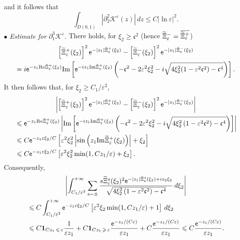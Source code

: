 \documentclass[10pt]{amsart}
\theoremstyle{definition}\newtheorem{defi}[theo]{Definition}\newtheorem{rema}[theo]{Remark}\newtheorem{exam}[theo]{Example}\newtheorem{exem}[theo]{Example}\newtheorem{nota}[theo]{Notation}
\newcommand*\p{\partial}
\newcommand{\Imm}{\mathrm{Im}}
\newcommand{\Rel}{\mathrm{Re}}
\newcommand*\BK{\mathcal{K}}
\newcommand{\bfun}{\mathbf{1}}
\newcommand*\ex{{\sf e}}
\newcommand*\cs{{\mathfrak c}}
\newcommand*\ii{\infty}
\newcommand*\gs{\geqslant }
\newcommand*\ls{\leqslant }
\newcommand*\e{\varepsilon}
\newcommand*\lne{\lvert \ln \varepsilon \rvert}
\renewcommand*\t{\tilde}
\let\oldtilde\tilde
\renewcommand*{\tilde}[1]{\mathchoice{\widetilde{#1}}{\widetilde{#1}}{\oldtilde{#1}}{\oldtilde{#1}}}
\begin{document}
and it follows that
\[
\int_{D(0,1)} \left\lvert \p_2^2 \BK^\e (z) \right\rvert \, dz \ls C \lne^2.
\]
\noindent $ \bullet $ \emph{Estimate for $ \p_1^3 \BK^\e $.} There holds, for $ \xi_2 \gs \cs^2 $ (hence $ \t\Xi_\e^- = \overline{ \t\Xi_\e^+ }$)
\begin{multline*}
 \left[\t\Xi_\e^+ (\xi_2)\right]^2 \ex^{- |z_1| \t\Xi_\e^+ (\xi_2) } - \left[\t\Xi_\e^- (\xi_2)\right]^2 \ex^{- |z_1| \t\Xi_\e^- (\xi_2) }
\\  = i \ex^{- z_1 \Rel \t\Xi_\e^+ (\xi_2) } \Imm \left[\ex^{- i z_1 \Imm \t\Xi_\e^+ (\xi_2) } \left(- \cs^2 - 2 \e^2 \xi_2^2 - i \sqrt{ 4 \xi_2^2 (1 - \e^2 \cs^2) - \cs^4 } \right) \right].
\end{multline*}
It then follows that, for $ \xi_2 \gs C_1 / \e^{2} $,
\begin{multline*}
\left\lvert \left[\t\Xi_\e^+ (\xi_2)\right]^2 \ex^{- |z_1| \t\Xi_\e^+ (\xi_2) } - \left[\t\Xi_\e^- (\xi_2)\right]^2 \ex^{- |z_1| \t\Xi_\e^- (\xi_2) } \right\rvert
\\
\begin{aligned}
& \ls
\ex^{- z_1 \Rel \t\Xi_\e^+ (\xi_2) } \left\lvert \Imm \left[\ex^{- i z_1 \Imm \t\Xi_\e^+ (\xi_2) } \left(- \cs^2 - 2 \e^2 \xi_2^2 - i \sqrt{ 4 \xi_2^2 \left(1 - \e^2 \cs^2\right) - \cs^4 } \right) \right] \right\rvert
\\ & \ls C \ex^{- z_1 \e \xi_2 / C } \left[\e^2 \xi_2^2 \left\lvert \sin\left(z_1 \Imm \t\Xi_\e^+ (\xi_2)\right) \right\rvert + \xi_2 \right]
\\ & \ls C \ex^{- z_1 \e \xi_2 /C } \left[\e^2 \xi_2^2 \min(1, C z_1 / \e) + \xi_2 \right].
\end{aligned}
\end{multline*}
Consequently,
\begin{multline*}
\left\lvert \int_{ C_1 / \e^{2}}^{+\ii} \sum_{s =\pm} \frac{ s \t\Xi_\e^s (\xi_2)^2 \ex^{- |z_1| \t\Xi_\e^s (\xi_2) + i z_2 \xi_2} }{ \sqrt{ 4 \xi_2^2 \left(1 - \e^2 \cs^2\right) - \cs^4 } } \, d\xi_2 \right\rvert
\\
\begin{aligned}
& \ls C \int_{ C_1 / \e^{2}}^{+\ii} \ex^{- z_1 \e \xi_2 / C } \left[\e^2 \xi_2 \min(1, C z_1 / \e) + 1 \right] \, d\xi_2
\\ & \ls C \bfun_{C z_1\,\ls\,\e} \frac{1}{\e z_1} + C \bfun_{C z_1\,\gs\,\e} \frac{\ex^{- z_1 / (C\e) }}{\e z_1} + C \frac{\ex^{- z_1 / (C\e) }}{\e z_1}
\ls C \frac{\ex^{- z_1 / (C \e) }}{\e z_1}.
\end{aligned}
\end{multline*}
\end{document}
